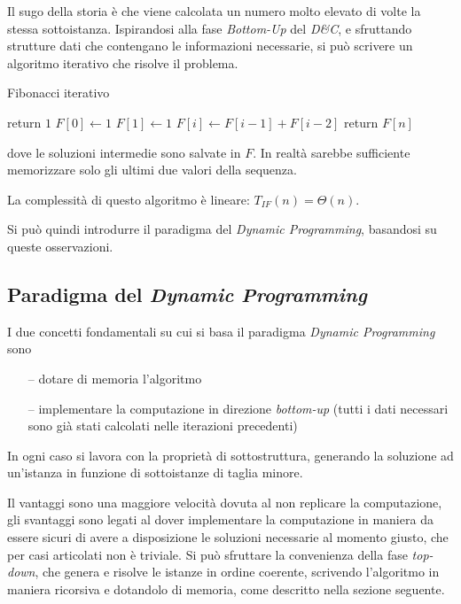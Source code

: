 Il sugo della storia è che viene calcolata un numero molto elevato di volte la stessa sottoistanza. Ispirandosi alla fase \emph{Bottom-Up} del \emph{D\&C}, e sfruttando strutture dati che contengano le informazioni necessarie, si può scrivere un algoritmo iterativo che risolve il problema.
\begin{algorithm}[H]
\caption{Fibonacci iterativo}\label{alg:itfib}
\begin{algorithmic}[1]
            \State return $1$
        \EndIf
        \State $F[0] \gets 1$
        \State $F[1] \gets 1$
            \State $F[i] \gets F[i-1] + F[i-2]$
        \EndFor
        \State return $F[n]$
    \EndProcedure
\end{algorithmic}
\end{algorithm}
\noindent
dove le soluzioni intermedie sono salvate in $F$. In realtà sarebbe sufficiente memorizzare solo gli ultimi due valori della sequenza.

La complessità di questo algoritmo è lineare: $T_{IF}(n) = \Theta \left( n \right)$.

Si può quindi introdurre il paradigma del \emph{Dynamic Programming}, basandosi su queste osservazioni.

\subsection{Paradigma del \emph{Dynamic Programming}}
I due concetti fondamentali su cui si basa il paradigma \emph{Dynamic Programming} sono
\begin{itemize}[noitemsep,topsep=0pt,parsep=0pt,partopsep=0pt]
    \item[--] dotare di memoria l'algoritmo
    \item[--] implementare la computazione in direzione \emph{bottom-up} (tutti i dati necessari sono già stati calcolati nelle iterazioni precedenti)
\end{itemize}
In ogni caso si lavora con la proprietà di sottostruttura, generando la soluzione ad un'istanza in funzione di sottoistanze di taglia minore.

Il vantaggi sono una maggiore velocità dovuta al non replicare la computazione, gli svantaggi sono legati al dover implementare la computazione in maniera da essere sicuri di avere a disposizione le soluzioni necessarie al momento giusto, che per casi articolati non è triviale. Si può sfruttare la convenienza della fase \emph{top-down}, che genera e risolve le istanze in ordine coerente, scrivendo l'algoritmo in maniera ricorsiva e dotandolo di memoria, come descritto nella sezione seguente.

